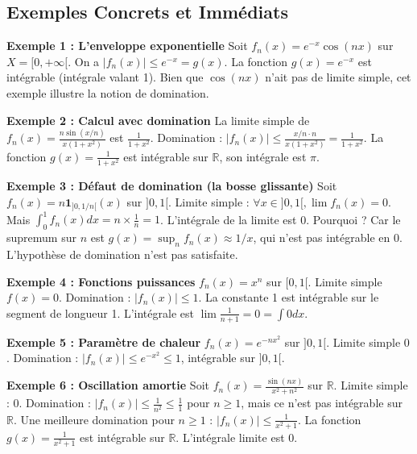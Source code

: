 \documentclass[11pt,a4paper]{article}
\begin{document}
\subsection{Exemples Concrets et Immédiats}

\textbf{Exemple 1 : L'enveloppe exponentielle}
Soit $f_n(x) = e^{-x} \cos(nx)$ sur $X = [0, +\infty[$.
On a $|f_n(x)| \le e^{-x} = g(x)$. La fonction $g(x) = e^{-x}$ est intégrable (intégrale valant 1).
Bien que $\cos(nx)$ n'ait pas de limite simple, cet exemple illustre la notion de domination.


\begin{center}
\end{center}


\textbf{Exemple 2 : Calcul avec domination}
La limite simple de $f_n(x) = \frac{n\sin(x/n)}{x(1+x^2)}$ est $\frac{1}{1+x^2}$.
Domination : $|f_n(x)| \le \frac{x/n \cdot n}{x(1+x^2)} = \frac{1}{1+x^2}$.
La fonction $g(x) = \frac{1}{1+x^2}$ est intégrable sur $\mathbb{R}$, son intégrale est $\pi$.

\textbf{Exemple 3 : Défaut de domination (la bosse glissante)}
Soit $f_n(x) = n \mathbf{1}_{]0, 1/n[}(x)$ sur $]0, 1[$.
Limite simple : $\forall x \in ]0, 1[, \lim f_n(x) = 0$.
Mais $\int_0^1 f_n(x) dx = n \times \frac{1}{n} = 1$. L'intégrale de la limite est 0.
Pourquoi ? Car le supremum sur $n$ est $g(x) = \sup_n f_n(x) \approx 1/x$, qui n'est pas intégrable en 0. L'hypothèse de domination n'est pas satisfaite.

\textbf{Exemple 4 : Fonctions puissances}
$f_n(x) = x^n$ sur $[0, 1[$.
Limite simple $f(x) = 0$.
Domination : $|f_n(x)| \le 1$. La constante 1 est intégrable sur le segment de longueur 1.
L'intégrale est $\lim \frac{1}{n+1} = 0 = \int 0 dx$.

\textbf{Exemple 5 : Paramètre de chaleur}
$f_n(x) = e^{-nx^2}$ sur $]0, 1[$.
Limite simple $0$. Domination : $|f_n(x)| \le e^{-x^2} \le 1$, intégrable sur $]0, 1[$.

\textbf{Exemple 6 : Oscillation amortie}
Soit $f_n(x) = \frac{\sin(nx)}{x^2+n^2}$ sur $\mathbb{R}$.
Limite simple : $0$.
Domination : $|f_n(x)| \le \frac{1}{n^2} \le \frac{1}{1}$ pour $n \ge 1$, mais ce n'est pas intégrable sur $\mathbb{R}$.
Une meilleure domination pour $n \ge 1$ : $|f_n(x)| \le \frac{1}{x^2+1}$. La fonction $g(x) = \frac{1}{x^2+1}$ est intégrable sur $\mathbb{R}$.
L'intégrale limite est 0.
\end{document}
